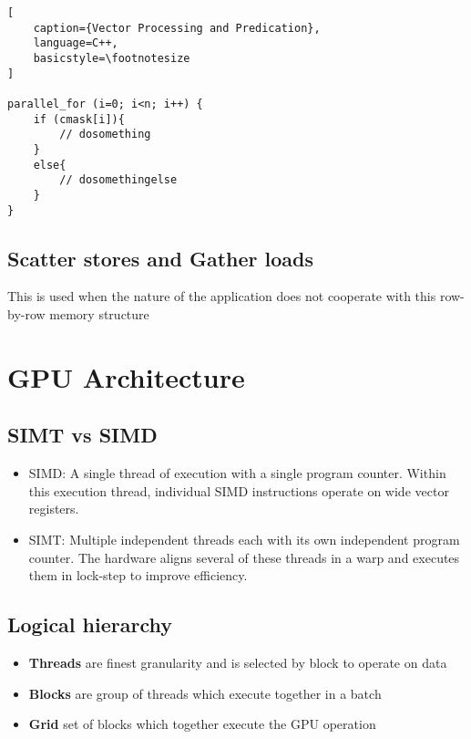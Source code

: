 \documentclass{article}
\begin{document}
\begin{multicols*}{2}
\begin{lstlisting}[
    caption={Vector Processing and Predication},
    language=C++, 
    basicstyle=\footnotesize
]

parallel_for (i=0; i<n; i++) {
    if (cmask[i]){
        // dosomething
    }
    else{
        // dosomethingelse
    }
}

\end{lstlisting}

\subsection{Scatter stores and Gather loads}
This is used when the nature of the application does not cooperate with this row-by-row memory structure

\section{GPU Architecture}
\subsection{SIMT vs SIMD}
\begin{itemize}
    \item SIMD: A single thread of execution with a single program counter. Within this execution thread, individual SIMD instructions operate on wide vector registers.
    \item SIMT: Multiple independent threads each with its own independent program counter. The hardware aligns several of these threads in a warp and executes them in lock-step to improve efficiency.
\end{itemize}
\subsection{Logical hierarchy}
\begin{itemize}
    \item \textbf{Threads} are finest granularity and is selected by block to operate on data
    \item \textbf{Blocks} are group of threads which execute together in a batch
    \item \textbf{Grid} set of blocks which together execute the GPU operation
\end{itemize}


\end{multicols*}
\end{document}

